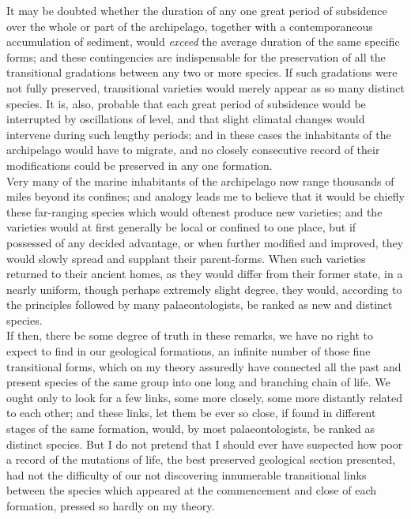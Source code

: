 \indent It may be doubted whether the duration of any one great period of subsidence over the whole or part of the archipelago, together with a contemporaneous accumulation of sediment, would \emph{exceed} the average duration of the same specific forms; and these contingencies are indispensable for the preservation of all the transitional gradations between any two or more species. If such gradations were not fully preserved, transitional varieties would merely appear as so many distinct species. It is, also, probable that each great period of subsidence would be interrupted by oscillations of level, and that slight climatal changes would intervene during such lengthy periods; and in these cases the inhabitants of the archipelago would have to migrate, and no closely consecutive record of their modifications could be preserved in any one formation.\\
\indent Very many of the marine inhabitants of the archipelago now range thousands of miles beyond its confines; and analogy leads me to believe that it would be chiefly these far-ranging species which would oftenest produce new varieties; and the varieties would at first generally be local or confined to one place, but if possessed of any decided advantage, or when further modified and improved, they would slowly spread and supplant their parent-forms.  When such varieties returned to their ancient homes, as they would differ from their former state, in a nearly uniform, though perhaps extremely slight degree, they would, according to the principles followed by many palaeontologists, be ranked as new and distinct species.\\
\indent If then, there be some degree of truth in these remarks, we have no right to expect to find in our geological formations, an infinite number of those fine transitional forms, which on my theory assuredly have connected all the past and present species of the same group into one long and branching chain of life. We ought only to look for a few links, some more closely, some more distantly related to each other; and these links, let them be ever so close, if found in different stages of the same formation, would, by most palaeontologists, be ranked as distinct species. But I do not pretend that I should ever have suspected how poor a record of the mutations of life, the best preserved geological section presented, had not the difficulty of our not discovering innumerable transitional links between the species which appeared at the commencement and close of each formation, pressed so hardly on my theory.\\
